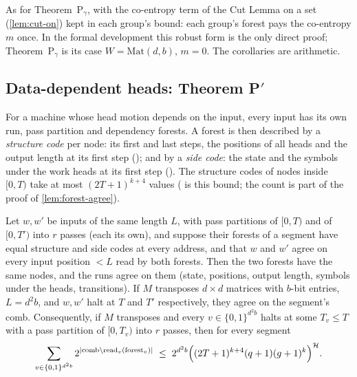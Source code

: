 \begin{outline}
As for Theorem~P$_\gamma$, with the co-entropy term of the Cut Lemma on a set (\cref{lem:cut-on}) kept in
each group's bound: each group's forest pays the co-entropy $m$ once. In the formal development this robust
form is the only direct proof; Theorem~P$_\gamma$ is its case $W=\mathrm{Mat}(d,b)$, $m=0$. The
corollaries are arithmetic.
\end{outline}

\subsection{Data-dependent heads: Theorem P\texorpdfstring{$'$}{'}}

For a machine whose head motion depends on the input, every input has its own run, pass partition
and dependency forests. A forest is then described by a \emph{structure code} per node: its first
and last steps, the positions of all heads and the output length at its first step
(); and by a \emph{side code}: the state and the symbols under the work heads at its
first step (). The structure codes of nodes inside $[0,T)$ take at most
$(2T+1)^{k+4}$ values ( is this bound; the count is part of the proof of
\cref{lem:forest-agree}).

\begin{lemma}\label{lem:forest-agree}
Let $w,w'$ be inputs of the same length $L$, with pass partitions of $[0,T)$ and of $[0,T')$ into $r$
passes (each its own), and suppose their forests of a segment have equal structure and side codes at every
address, and that $w$ and $w'$ agree on every input position $<L$ read by both forests. Then the two
forests have the same nodes, and the runs agree on them (state, positions, output length, symbols under the
heads, transitions). If $M$ transposes $d\times d$ matrices with $b$-bit entries, $L=d^2b$, and $w,w'$ halt
at $T$ and $T'$ respectively, they agree on the segment's comb. Consequently, if $M$ transposes and every
$v\in\{0,1\}^{d^2b}$ halts at some $T_v\le T$ with a pass partition of $[0,T_v)$ into $r$ passes, then for
every segment
\[
  \sum_{v\in\{0,1\}^{d^2b}}2^{\lvert \mathrm{comb}\setminus\mathrm{read}_v(\mathrm{forest}_v) \rvert}
  \;\le\;2^{d^2b}\Bigl((2T+1)^{k+4}(q+1)(g+1)^k\Bigr)^{\mathcal{H}}.
\]
\end{lemma}

